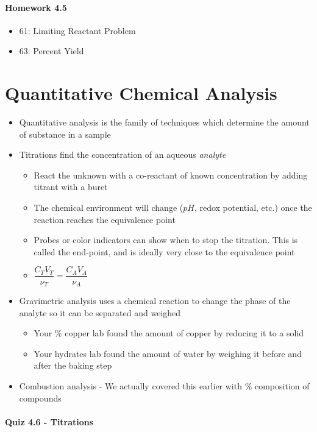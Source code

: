 \documentclass[12pt, openany, letterpaper]{memoir}
\begin{document}
\paragraph*{Homework 4.5}
\begin{itemize}
  \item 61: Limiting Reactant Problem
  \item 63: Percent Yield
\end{itemize}

\section{Quantitative Chemical Analysis}
\begin{itemize}
  \item Quantitative analysis is the family of techniques which determine the amount of substance in a sample
  \item Titrations find the concentration of an aqueous \emph{analyte}
    \begin{itemize}
      \item React the unknown with a co-reactant of known concentration by adding titrant with a buret
      \item The chemical environment will change ($pH$, redox potential, etc.) once the reaction reaches the equivalence point
      \item Probes or color indicators can show when to stop the titration. This is called the end-point, and is ideally very close to the equivalence point
      \item $\dfrac{C_TV_T}{\nu_T}=\dfrac{C_AV_A}{\nu_A}$
    \end{itemize}
  \item Gravimetric analysis uses a chemical reaction to change the phase of the analyte so it can be separated and weighed
    \begin{itemize}
      \item Your \% copper lab found the amount of copper by reducing it to a solid
      \item Your hydrates lab found the amount of water by weighing it before and after the baking step
    \end{itemize}
  \item Combustion analysis - We actually covered this earlier with \% composition of compounds
\end{itemize}

\paragraph*{Quiz 4.6 - Titrations}
\end{document}
